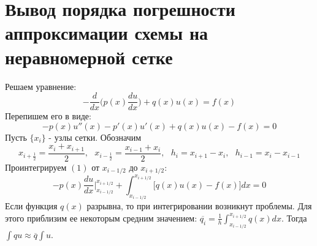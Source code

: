 \documentclass[12pt]{article}
\begin{document}
\section*{Вывод порядка погрешности аппроксимации схемы на неравномерной сетке}
Решаем уравнение:
\[
-\frac{d}{dx} \bigg(p(x) \frac{du}{dx}\bigg) +q(x)u(x)= f(x)
\]
Перепишем его в виде:
\begin{equation}
-p(x)u''(x)-p'(x)u'(x)+q(x)u(x)-f(x)=0
\end{equation}
Пусть $\{x_i\}$ - узлы сетки. Обозначим 
\[
x_{i+\frac{1}{2}} = \frac{x_i+x_{i+1}}{2}, \text{ } x_{i-\frac{1}{2}} = \frac{x_{i-1}+x_{i}}{2}, \text{ } h_i=x_{i+1}-x_i, \text{ } h_{i-1}=x_i-x_{i-1}
\]
Проинтегрируем $(1)$ от $x_{i-1/2}$ до $x_{i+1/2}$:
\[
-p(x)\frac{du}{dx}\bigg|_{x_{i-1/2}}^{x_{i+1/2}} + \int_{x_{i-1/2}}^{x_{i+1/2}}\big[q(x)u(x)-f(x)\big]dx =0
\]
Если функция $q(x)$ разрывна, то при интегрировании возникнут проблемы. Для этого приблизим ее некоторым средним значением: $\overline{q_i} = \frac{1}{h}\int_{x_{i-1/2}}^{x_{i+1/2}}q(x)dx$. Тогда $\int qu \approx \overline{q}\int u$.
\end{document}
